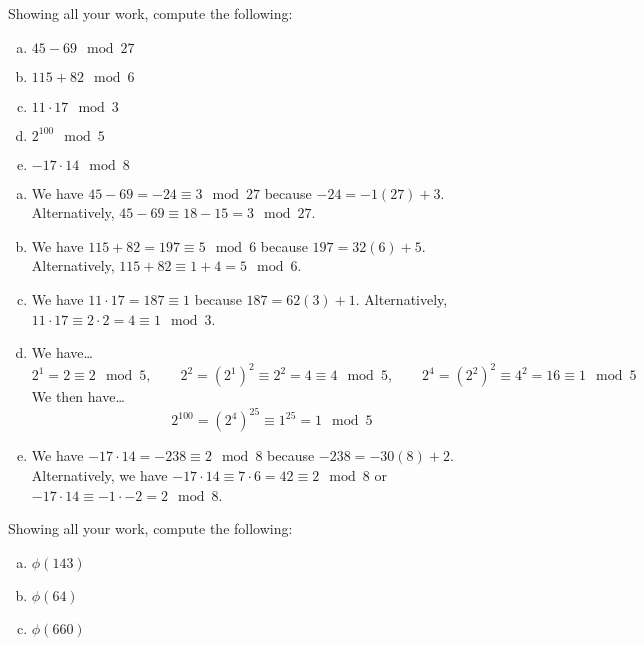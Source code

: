 \documentclass[11pt,letterpaper]{article}
\begin{document}

 Showing all your work, compute the following:
	\begin{enumerate}[(a)]
	\item $45 - 69 \mod 27$
	\item $115 + 82 \mod 6$
	\item $11 \cdot 17 \mod 3$
	\item $2^{100} \mod 5$
	\item $-17 \cdot 14 \mod 8$
	\end{enumerate} \pspace

\sol 
\begin{enumerate}[(a)]
\item We have $45 - 69= -24 \equiv 3 \mod 27$ because $-24= -1(27) + 3$. Alternatively, $45 - 69 \equiv 18 - 15= 3 \mod 27$. \pspace

\item We have $115 + 82= 197 \equiv 5 \mod 6$ because $197= 32(6) + 5$. Alternatively, $115 + 82 \equiv 1 + 4= 5 \mod 6$. \pspace

\item We have $11 \cdot 17= 187 \equiv 1$ because $187= 62(3) + 1$. Alternatively, $11 \cdot 17 \equiv 2 \cdot 2= 4 \equiv 1 \mod 3$. \pspace

\item We have\dots
	\[
	2^1= 2 \equiv 2 \mod 5, \qquad 2^2= (2^1)^2 \equiv 2^2= 4 \equiv 4 \mod 5, \qquad 2^4= (2^2)^2 \equiv 4^2= 16 \equiv 1 \mod 5
	\]
We then have\dots
	\[
	2^{100}= (2^4)^{25} \equiv 1^{25}= 1 \mod 5
	\] \pspace

\item We have $-17 \cdot 14= -238 \equiv 2 \mod 8$ because $-238= -30(8) + 2$. Alternatively, we have $-17 \cdot 14 \equiv 7 \cdot 6= 42 \equiv 2 \mod 8$ or $-17 \cdot 14 \equiv -1 \cdot -2= 2 \mod 8$. 
\end{enumerate}



\newpage



 Showing all your work, compute the following:
	\begin{enumerate}[(a)]
	\item $\phi(143)$
	\item $\phi(64)$
	\item $\phi(660)$
	\end{enumerate} \pspace
\end{document}
